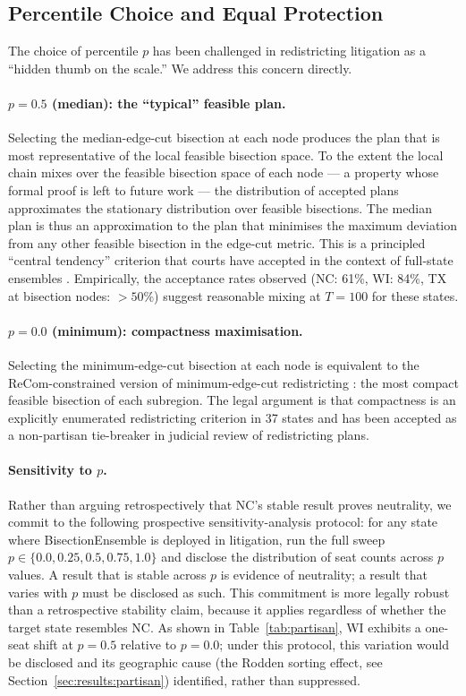 \subsection{Percentile Choice and Equal Protection}
\label{sec:legal:percentile}

The choice of percentile $p$ has been challenged in redistricting litigation
as a ``hidden thumb on the scale.'' We address this concern directly.

\paragraph{$p = 0.5$ (median): the ``typical'' feasible plan.}
Selecting the median-edge-cut bisection at each node produces the plan that
is most representative of the local feasible bisection space. To the extent
the local chain mixes over the feasible bisection space of each node --- a
property whose formal proof is left to future work --- the distribution of
accepted plans approximates the stationary distribution over feasible bisections.
The median plan is thus an approximation to the plan that minimises the maximum
deviation from any other feasible bisection in the edge-cut metric. This is a
principled ``central tendency'' criterion that courts have accepted in the context
of full-state ensembles \citep{herschlag2020quantifying}. Empirically, the
acceptance rates observed (NC: 61\%, WI: 84\%, TX at bisection nodes: $>50\%$)
suggest reasonable mixing at $T=100$ for these states.

\paragraph{$p = 0.0$ (minimum): compactness maximisation.}
Selecting the minimum-edge-cut bisection at each node is equivalent to
the ReCom-constrained version of minimum-edge-cut redistricting
\citep{dellaLibera2026mec}: the most compact feasible bisection of each
subregion. The legal argument is that compactness is an explicitly enumerated
redistricting criterion in 37 states and has been accepted as a non-partisan
tie-breaker in judicial review of redistricting plans.

\paragraph{Sensitivity to $p$.}
Rather than arguing retrospectively that NC's stable result proves neutrality,
we commit to the following prospective sensitivity-analysis protocol: for any
state where BisectionEnsemble is deployed in litigation, run the full sweep
$p \in \{0.0, 0.25, 0.5, 0.75, 1.0\}$ and disclose the distribution of seat
counts across $p$ values. A result that is stable across $p$ is evidence of
neutrality; a result that varies with $p$ must be disclosed as such. This
commitment is more legally robust than a retrospective stability claim, because
it applies regardless of whether the target state resembles NC. As shown in
Table~\ref{tab:partisan}, WI exhibits a one-seat shift at $p=0.5$ relative
to $p=0.0$; under this protocol, this variation would be disclosed and its
geographic cause (the Rodden sorting effect, see Section~\ref{sec:results:partisan})
identified, rather than suppressed.

